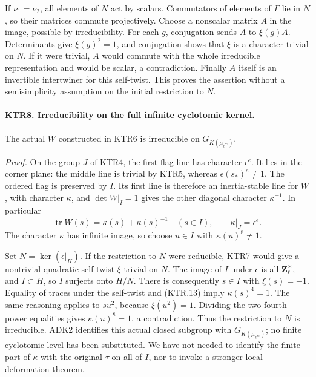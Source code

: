 If \(\nu_1=\nu_2\), all elements of \(N\) act by scalars.
Commutators of elements of \(\Gamma\) lie in \(N\), so
their matrices commute projectively.  Choose a nonscalar matrix
\(A\) in the image, possible by irreducibility.  For each
\(g\), conjugation sends \(A\) to \(\xi(g)A\).
Determinants give \(\xi(g)^2=1\), and conjugation shows that
\(\xi\) is a character trivial on \(N\).
If it were trivial, \(A\) would commute with the whole
irreducible representation and would be scalar, a contradiction.
Finally \(A\) itself is an invertible intertwiner for this
self-twist.  This proves the assertion without a semisimplicity
assumption on the initial restriction to \(N\).

\paragraph{KTR8. Irreducibility on the full infinite cyclotomic kernel.}
\label{claim:KTR8}
The actual \(W\) constructed in KTR6 is irreducible on
\(G_{K(\mu_{\ell^\infty})}\).

\emph{Proof.}
On the group \(J\) of KTR4, the first flag line has character
\(\epsilon^e\).  It lies in the corner plane: the middle
line is trivial by KTR5, whereas \(\epsilon(s_*)^e\ne1\).
The ordered flag is preserved by \(I\).  Its first line is
therefore an inertia-stable line for \(W\), with character
\(\kappa\), and \(\det W|_I=1\) gives the other diagonal
character \(\kappa^{-1}\).  In particular
\[
 \operatorname{tr}W(s)=\kappa(s)+\kappa(s)^{-1}\quad(s\in I),
 \qquad \kappa|_J=\epsilon^e.
 \tag{KTR.13}
\]
The character \(\kappa\) has infinite image, so choose
\(u\in I\) with \(\kappa(u)^8\ne1\).

Set \(N=\ker(\epsilon|_H)\).  If the restriction to \(N\)
were reducible, KTR7 would give a nontrivial quadratic self-twist
\(\xi\) trivial on \(N\).  The image of \(I\) under
\(\epsilon\) is all \(\mathbf Z_\ell^\times\), and
\(I\subset H\), so \(I\) surjects onto \(H/N\).
There is consequently \(s\in I\) with \(\xi(s)=-1\).
Equality of traces under the self-twist and (KTR.13) imply
\(\kappa(s)^4=1\).  The same reasoning applies to
\(su^2\), because \(\xi(u^2)=1\).  Dividing the two
fourth-power equalities gives \(\kappa(u)^8=1\), a
contradiction.  Thus the restriction to \(N\) is irreducible.
ADK2 identifies this actual closed subgroup with
\(G_{K(\mu_{\ell^\infty})}\); no finite cyclotomic level
has been substituted.  We have not needed to identify the finite
part of \(\kappa\) with the original \(\tau\) on all of
\(I\), nor to invoke a stronger local deformation theorem.

